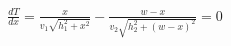 \documentclass[preview]{standalone}
\begin{document}
\begin{align*}
\frac{dT}{dx} = \frac{x}{v_1\sqrt{h_1^2 + x^2}} - \frac{w-x}{v_2\sqrt{h_2^2 + (w-x)^2}} = 0
\end{align*}
\end{document}
